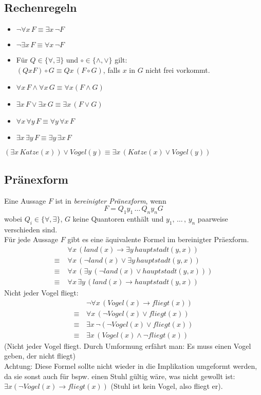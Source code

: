 \subsection{Rechenregeln}
\begin{itemize}
\item $\neg \forall x \, F \equiv \exists x\, \neg F$
\item $\neg \exists x \, F \equiv \forall x\, \neg F$
\item Für $Q \in \{\forall, \exists\}$ und $\circ \in \{ \wedge, \vee\}$ gilt:\\
$(Q x F ) \circ G \equiv Qx\,(F\circ G)$, falls $x$ in $G$ nicht frei vorkommt.
\item $\forall x \, F \wedge \forall x \, G \equiv \forall x (F \wedge G)$
\item $\exists x \, F \vee \exists x \, G \equiv \exists x \, (F \vee G)$
\item $\forall x \, \forall y \, F \equiv \forall y \, \forall x \, F$
\item $\exists x \, \exists y \, F \equiv \exists y \, \exists x \, F$
\end{itemize}

$(\exists x\,Katze(x)) \vee Vogel(y)\equiv \exists x \, (Katze (x) \vee Vogel(y))$

\subsection{Pränexform}
 Eine Aussage $F$ ist in \emph{bereinigter Pränexform}, wenn
$$F= Q_1 y_1 \,\dots\, Q_ny_nG$$
wobei $Q_i\in \{\forall, \exists\}$, $G$ keine Quantoren enthält und $y_1, \,\dots\,,\, y_n$ paarweise verschieden sind.\bigskip\\
Für jede Aussage $F$ gibt es eine äquivalente Formel im bereinigter Präexform.
\begin{align*}
&\forall x \, (land(x) \to \exists y \, hauptstadt(y,x))\\
\equiv \;&\forall x\, (\neg land(x) \vee \exists y\, hauptstadt(y,x))\\
\equiv \;&\forall x\, (\exists y \, (\neg land(x) \vee hauptstadt(y,x)))\\
\equiv \;&\forall x\, \exists y \, (land (x) \to hauptstadt(y,x))
\end{align*}
Nicht jeder Vogel fliegt:
\begin{align*}
&\neg \forall x \, (Vogel (x) \to fliegt(x))\\
\equiv \, & \forall x \, (\neg Vogel(x) \vee fliegt(x))\\
\equiv \, & \exists x \, \neg (\neg Vogel(x) \vee fliegt(x))\\
\equiv \, & \exists x \, (Vogel(x) \wedge \neg fliegt(x))
\end{align*}
(Nicht jeder Vogel fliegt. Durch Umformung erfährt man: Es muss einen Vogel geben, der nicht fliegt)\\
Achtung: Diese Formel sollte nicht wieder in die Implikation umgeformt werden, da sie sonst auch für bspw. einen Stuhl gültig wäre, was nicht gewollt ist: $\exists x (\neg Vogel(x) \to fliegt(x))$ (Stuhl ist kein Vogel, also fliegt er).
